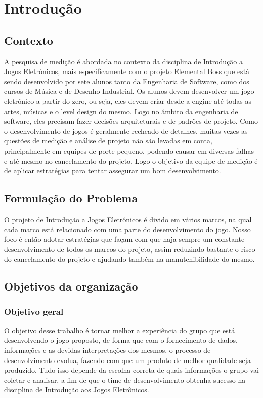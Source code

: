\chapter{Introdução}

\section{Contexto}
	
	A pesquisa de medição é abordada no contexto da disciplina de Introdução a Jogos Eletrônicos, mais especifícamente com o projeto Elemental Boss que está sendo desenvolvido por sete alunos tanto da Engenharia de Software, como dos cursos de Música e de Desenho Industrial. Os alunos devem desenvolver um jogo eletrônico a partir do zero, ou seja, eles devem criar desde a engine até todas as artes, músicas e o level design do mesmo. Logo no âmbito da engenharia de software, eles precisam fazer decisões arquiteturais e de padrões de projeto.
	Como o desenvolvimento de jogos é geralmente recheado de detalhes, muitas vezes as questões de medição e análise de projeto não são levadas em conta, principalmente em equipes de porte pequeno, podendo causar em diversas falhas e até mesmo no cancelamento do projeto. Logo o objetivo da equipe de medição é de aplicar estratégias para tentar assegurar um bom desenvolvimento.

\section{Formulação do Problema}

	O projeto de Introdução a Jogos Eletrônicos é divido em vários marcos, na qual cada marco está relacionado com uma parte do desenvolvimento do jogo. Nosso foco é então adotar estratégias que façam com que haja sempre um constante desenvolvimento de todos os marcos do projeto, assim reduzindo bastante o risco do cancelamento do projeto e ajudando também na manutenibilidade do mesmo.

\section{Objetivos da organização}

\subsection{Objetivo geral}
	O objetivo desse trabalho é tornar melhor a experiência do grupo que está desenvolvendo o jogo proposto, de forma que com o fornecimento de dados, informações e as devidas interpretações dos mesmos, o processo de desenvolvimento evolua, fazendo com que um produto de melhor qualidade seja produzido. Tudo isso depende da escolha correta de quais informações o grupo vai coletar e analisar, a fim de que o time de desenvolvimento obtenha sucesso na disciplina de Introdução aos Jogos Eletrônicos.

